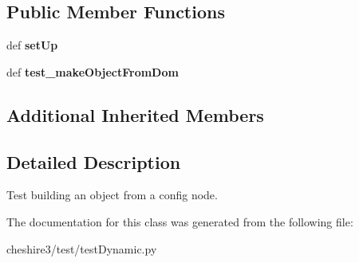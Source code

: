 \subsection*{Public Member Functions}
\begin{DoxyCompactItemize}
\item 
\hypertarget{classcheshire3_1_1test_1_1test_dynamic_1_1_make_object_from_dom_test_case_a05f13a0a027cf346791e834dac8e0b3f}{def {\bfseries set\-Up}}\label{classcheshire3_1_1test_1_1test_dynamic_1_1_make_object_from_dom_test_case_a05f13a0a027cf346791e834dac8e0b3f}

\item 
\hypertarget{classcheshire3_1_1test_1_1test_dynamic_1_1_make_object_from_dom_test_case_a4f64283e80e19d84d1175a388c6531cd}{def {\bfseries test\-\_\-make\-Object\-From\-Dom}}\label{classcheshire3_1_1test_1_1test_dynamic_1_1_make_object_from_dom_test_case_a4f64283e80e19d84d1175a388c6531cd}

\end{DoxyCompactItemize}
\subsection*{Additional Inherited Members}


\subsection{Detailed Description}
\begin{DoxyVerb}Test building an object from a config node.\end{DoxyVerb}
 

The documentation for this class was generated from the following file\-:\begin{DoxyCompactItemize}
\item 
cheshire3/test/test\-Dynamic.\-py\end{DoxyCompactItemize}
